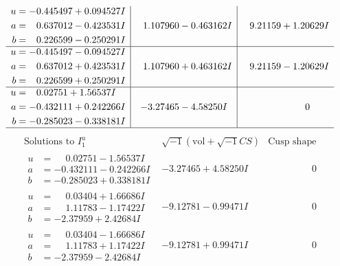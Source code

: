 \documentclass[1p]{elsarticle_modified}
\theoremstyle{definition}
\newcommand{\I}{\sqrt{-1}}
\begin{document}
$$\begin{array}{c|c|c}
\begin{aligned}
u &= -0.445497 + 0.094527 I \\
a &= \phantom{-}0.637012 - 0.423531 I \\
b &= \phantom{-}0.226599 - 0.250291 I\end{aligned}
 & \phantom{-}1.107960 - 0.463162 I & \phantom{-}9.21159 + 1.20629 I \\ \hline\begin{aligned}
u &= -0.445497 - 0.094527 I \\
a &= \phantom{-}0.637012 + 0.423531 I \\
b &= \phantom{-}0.226599 + 0.250291 I\end{aligned}
 & \phantom{-}1.107960 + 0.463162 I & \phantom{-}9.21159 - 1.20629 I \\ \hline\begin{aligned}
u &= \phantom{-}0.02751 + 1.56537 I \\
a &= -0.432111 + 0.242266 I \\
b &= -0.285023 - 0.338181 I\end{aligned}
 & -3.27465 - 4.58250 I & \phantom{-0.000000 } 0\\
 \hline 
 \end{array}$$\newpage$$\begin{array}{c|c|c}  
\text{Solutions to }I^u_{1}& \I (\text{vol} + \sqrt{-1}CS) & \text{Cusp shape}\\
 \hline 
\begin{aligned}
u &= \phantom{-}0.02751 - 1.56537 I \\
a &= -0.432111 - 0.242266 I \\
b &= -0.285023 + 0.338181 I\end{aligned}
 & -3.27465 + 4.58250 I & \phantom{-0.000000 } 0 \\ \hline\begin{aligned}
u &= \phantom{-}0.03404 + 1.66686 I \\
a &= \phantom{-}1.11783 - 1.17422 I \\
b &= -2.37959 + 2.42684 I\end{aligned}
 & -9.12781 - 0.99471 I & \phantom{-0.000000 } 0 \\ \hline\begin{aligned}
u &= \phantom{-}0.03404 - 1.66686 I \\
a &= \phantom{-}1.11783 + 1.17422 I \\
b &= -2.37959 - 2.42684 I\end{aligned}
 & -9.12781 + 0.99471 I & \phantom{-0.000000 } 0 \\ \hline\begin{aligned}

\end{aligned}
\end{array}$$
\end{document}
